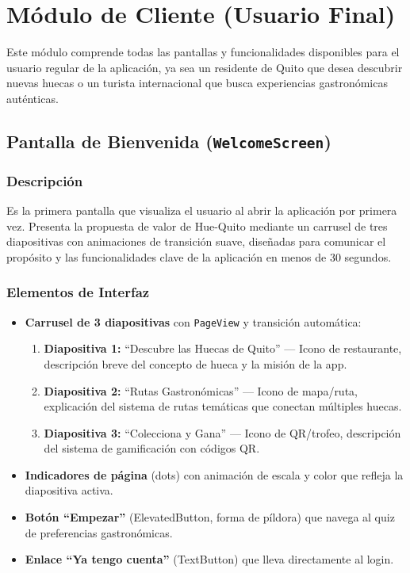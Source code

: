 \documentclass[11pt, a4paper, oneside]{report}
\begin{document}
\chapter{Módulo de Cliente (Usuario Final)}

Este módulo comprende todas las pantallas y funcionalidades disponibles para el usuario regular de la aplicación, ya sea un residente de Quito que desea descubrir nuevas huecas o un turista internacional que busca experiencias gastronómicas auténticas.

\section{Pantalla de Bienvenida (\texttt{WelcomeScreen})}

\subsection{Descripción}
Es la primera pantalla que visualiza el usuario al abrir la aplicación por primera vez. Presenta la propuesta de valor de Hue-Quito mediante un carrusel de tres diapositivas con animaciones de transición suave, diseñadas para comunicar el propósito y las funcionalidades clave de la aplicación en menos de 30 segundos.

\subsection{Elementos de Interfaz}
\begin{itemize}
  \item \textbf{Carrusel de 3 diapositivas} con \texttt{PageView} y transición automática:
  \begin{enumerate}
    \item \textbf{Diapositiva 1:} ``Descubre las Huecas de Quito'' --- Icono de restaurante, descripción breve del concepto de hueca y la misión de la app.
    \item \textbf{Diapositiva 2:} ``Rutas Gastronómicas'' --- Icono de mapa/ruta, explicación del sistema de rutas temáticas que conectan múltiples huecas.
    \item \textbf{Diapositiva 3:} ``Colecciona y Gana'' --- Icono de QR/trofeo, descripción del sistema de gamificación con códigos QR.
  \end{enumerate}
  \item \textbf{Indicadores de página} (dots) con animación de escala y color que refleja la diapositiva activa.
  \item \textbf{Botón ``Empezar''} (ElevatedButton, forma de píldora) que navega al quiz de preferencias gastronómicas.
  \item \textbf{Enlace ``Ya tengo cuenta''} (TextButton) que lleva directamente al login.
\end{itemize}
\end{document}
